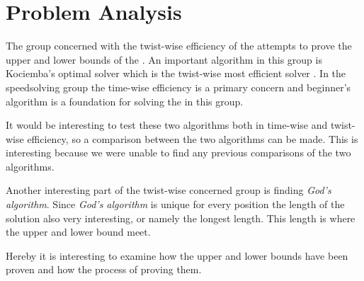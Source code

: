 \section{Problem Analysis}
The group concerned  with the twist-wise efficiency of the \rubik{} attempts to prove the upper and lower bounds of the \cube{}. 
An important algorithm in this group is Kociemba's optimal solver which is the twist-wise  most efficient solver \cite{rokicki09}. 
In the speedsolving group the time-wise efficiency is a primary concern and beginner's algorithm is a foundation for solving the \cube{} in this group. 

It would be interesting to test these two algorithms both in time-wise and twist-wise efficiency, so a comparison between the two algorithms can be made. 
This is interesting because we were unable to find any previous comparisons of the two algorithms. 

Another interesting part of the twist-wise concerned group is finding \textit{God's algorithm}.
Since \textit{God's algorithm} is unique for every position the length of the solution also very interesting, or namely the longest length. 
This length is where the upper and lower bound meet. 

Hereby it is interesting to examine how the upper and lower bounds have been proven and how the process of proving them.
